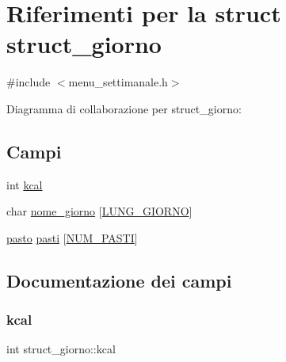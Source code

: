 \hypertarget{structstruct__giorno}{}\section{Riferimenti per la struct struct\+\_\+giorno}
\label{structstruct__giorno}


{\ttfamily \#include $<$menu\+\_\+settimanale.\+h$>$}



Diagramma di collaborazione per struct\+\_\+giorno\+:
\subsection*{Campi}
\begin{DoxyCompactItemize}
\item 
int \hyperlink{structstruct__giorno_adfdaabe9560cb3dc440b1b2a03b6aa9f}{kcal}
\item 
char \hyperlink{structstruct__giorno_a66562d54ebcd9adafc8bd6651d3cd4b3}{nome\+\_\+giorno} \mbox{[}\hyperlink{menu__settimanale_8h_a89f2bc47bf642f29f85eb025d9b096c1}{L\+U\+N\+G\+\_\+\+G\+I\+O\+R\+NO}\mbox{]}
\item 
\hyperlink{menu__settimanale_8h_a9bcb2afe3bf63e9bf406a2d1e7fa8644}{pasto} \hyperlink{structstruct__giorno_a89202927f5dc2d5ba6ca5d58431bdff5}{pasti} \mbox{[}\hyperlink{menu__settimanale_8h_a2000ebf33ae486fb0f53926d79ae1c7f}{N\+U\+M\+\_\+\+P\+A\+S\+TI}\mbox{]}
\end{DoxyCompactItemize}


\subsection{Documentazione dei campi}
\mbox{\label{structstruct__giorno_adfdaabe9560cb3dc440b1b2a03b6aa9f}} 
\subsubsection{\texorpdfstring{kcal}{kcal}}
{\footnotesize\ttfamily int struct\+\_\+giorno\+::kcal}

\mbox{\label{structstruct__giorno_a66562d54ebcd9adafc8bd6651d3cd4b3}} 
